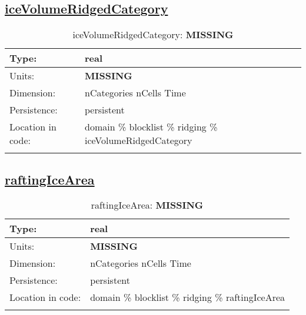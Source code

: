 \subsection[iceVolumeRidgedCategory]{\hyperref[sec:var_tab_ridging]{iceVolumeRidgedCategory}}
\label{subsec:var_sec_ridging_iceVolumeRidgedCategory}
\begin{center}
\begin{longtable}{| p{2.0in} | p{4.0in} |}
        \hline 
        Type: & real \\
        \hline 
        Units: & {\bf \color{red} MISSING} \\
        \hline 
        Dimension: & nCategories nCells Time \\
        \hline 
        Persistence: & persistent \\
        \hline 
         Location in code: & domain \% blocklist \% ridging \% iceVolumeRidgedCategory \\
         \hline 
    \caption{iceVolumeRidgedCategory: {\bf \color{red} MISSING}}
\end{longtable}
\end{center}
\subsection[raftingIceArea]{\hyperref[sec:var_tab_ridging]{raftingIceArea}}
\label{subsec:var_sec_ridging_raftingIceArea}
\begin{center}
\begin{longtable}{| p{2.0in} | p{4.0in} |}
        \hline 
        Type: & real \\
        \hline 
        Units: & {\bf \color{red} MISSING} \\
        \hline 
        Dimension: & nCategories nCells Time \\
        \hline 
        Persistence: & persistent \\
        \hline 
         Location in code: & domain \% blocklist \% ridging \% raftingIceArea \\
         \hline 
    \caption{raftingIceArea: {\bf \color{red} MISSING}}
\end{longtable}
\end{center}
